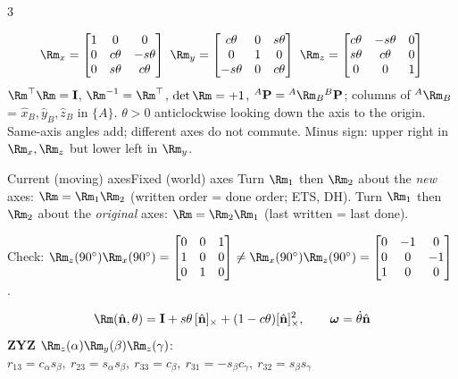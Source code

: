 \begin{multicols}{3}
\begin{fbx}
{\small\[\Rm_x=\begin{bmatrix}1&0&0\\0&c\theta&-s\theta\\0&s\theta&c\theta\end{bmatrix}\ \Rm_y=\begin{bmatrix}c\theta&0&s\theta\\0&1&0\\-s\theta&0&c\theta\end{bmatrix}\ \Rm_z=\begin{bmatrix}c\theta&-s\theta&0\\s\theta&c\theta&0\\0&0&1\end{bmatrix}\]}
$\Rm^\top\Rm=\mathbf I$, $\Rm^{-1}=\Rm^\top$, $\det\Rm=+1$, ${}^A\mathbf P={}^A\Rm_B{}^B\mathbf P$; columns of ${}^A\Rm_B$ = $\hat x_B,\hat y_B,\hat z_B$ in $\{A\}$. $\theta>0$ anticlockwise looking down the axis to the origin. Same-axis angles add; different axes do not commute. Minus sign: upper right in $\Rm_x,\Rm_z$ but lower left in $\Rm_y$.
\end{fbx}
\begin{twoway}{Current (moving) axes}{Fixed (world) axes}
Turn $\Rm_1$ then $\Rm_2$ about the \emph{new} axes: $\Rm=\Rm_1\Rm_2$ (written order = done order; ETS, DH).
\tcblower
Turn $\Rm_1$ then $\Rm_2$ about the \emph{original} axes: $\Rm=\Rm_2\Rm_1$ (last written = last done).
\end{twoway}
Check: $\Rm_z(90^\circ)\Rm_x(90^\circ)=\begin{bmatrix}0&0&1\\1&0&0\\0&1&0\end{bmatrix}\ne\Rm_x(90^\circ)\Rm_z(90^\circ)=\begin{bmatrix}0&-1&0\\0&0&-1\\1&0&0\end{bmatrix}$. \chk
\begin{fbx}[Rodrigues; angles from $\Rm$ ($r_{ij}$ = row $i$, col $j$) \pg{W3 38}]
\[\Rm(\hat{\mathbf n},\theta)=\mathbf I+s\theta\,[\hat{\mathbf n}]_\times+(1-c\theta)[\hat{\mathbf n}]_\times^2,\qquad\boldsymbol\omega=\dot\theta\hat{\mathbf n}\]
\textbf{ZYZ} $\Rm_z(\alpha)\Rm_y(\beta)\Rm_z(\gamma)$: $r_{13}=c_\alpha s_\beta,\ r_{23}=s_\alpha s_\beta,\ r_{33}=c_\beta,\ r_{31}=-s_\beta c_\gamma,\ r_{32}=s_\beta s_\gamma$

\end{fbx}
\end{multicols}
